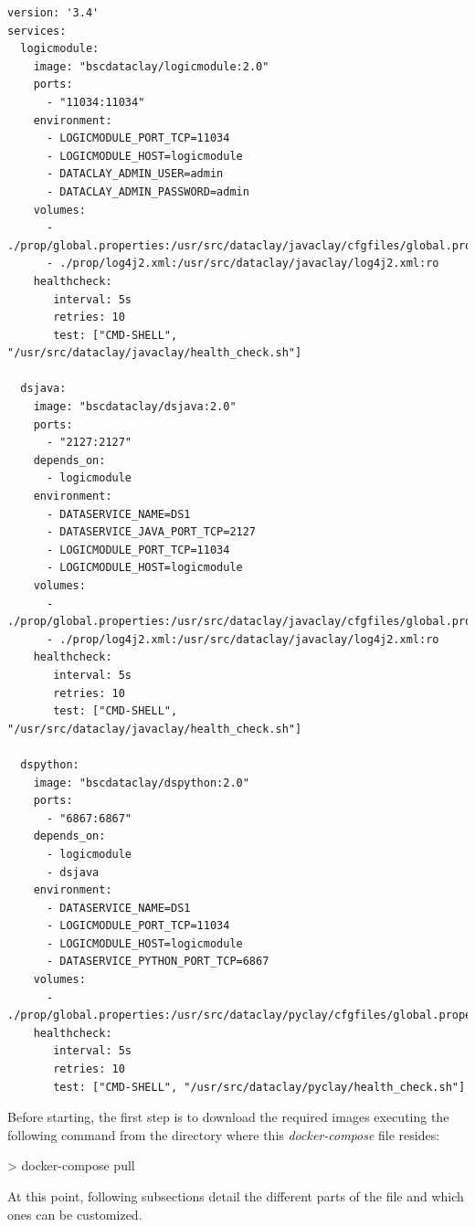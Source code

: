 \begin{tBox}
 \begin{lstlisting}[language=docker-compose-2, frame=none]
version: '3.4'
services:
  logicmodule:
    image: "bscdataclay/logicmodule:2.0"
    ports:
      - "11034:11034"
    environment:
      - LOGICMODULE_PORT_TCP=11034
      - LOGICMODULE_HOST=logicmodule
      - DATACLAY_ADMIN_USER=admin
      - DATACLAY_ADMIN_PASSWORD=admin
    volumes:
      - ./prop/global.properties:/usr/src/dataclay/javaclay/cfgfiles/global.properties:ro
      - ./prop/log4j2.xml:/usr/src/dataclay/javaclay/log4j2.xml:ro
    healthcheck:
       interval: 5s
       retries: 10
       test: ["CMD-SHELL", "/usr/src/dataclay/javaclay/health_check.sh"]
         
  dsjava:
    image: "bscdataclay/dsjava:2.0"
    ports:
      - "2127:2127"
    depends_on:
      - logicmodule
    environment:
      - DATASERVICE_NAME=DS1
      - DATASERVICE_JAVA_PORT_TCP=2127
      - LOGICMODULE_PORT_TCP=11034
      - LOGICMODULE_HOST=logicmodule
    volumes:
      - ./prop/global.properties:/usr/src/dataclay/javaclay/cfgfiles/global.properties:ro
      - ./prop/log4j2.xml:/usr/src/dataclay/javaclay/log4j2.xml:ro
    healthcheck:
       interval: 5s
       retries: 10
       test: ["CMD-SHELL", "/usr/src/dataclay/javaclay/health_check.sh"]
       
  dspython:
    image: "bscdataclay/dspython:2.0"
    ports:
      - "6867:6867"
    depends_on:
      - logicmodule
      - dsjava
    environment:
      - DATASERVICE_NAME=DS1
      - LOGICMODULE_PORT_TCP=11034
      - LOGICMODULE_HOST=logicmodule
      - DATASERVICE_PYTHON_PORT_TCP=6867
    volumes:
      - ./prop/global.properties:/usr/src/dataclay/pyclay/cfgfiles/global.properties:ro
    healthcheck:
       interval: 5s
       retries: 10
       test: ["CMD-SHELL", "/usr/src/dataclay/pyclay/health_check.sh"]
 \end{lstlisting}
\end{tBox}

Before starting, the first step is to download the required images executing the following command from the directory where this \textit{docker-compose} file resides:
\begin{tBox}
 \begin{bash}
  > docker-compose pull
 \end{bash}
\end{tBox}

At this point, following subsections detail the different parts of the file and which ones can be customized.

